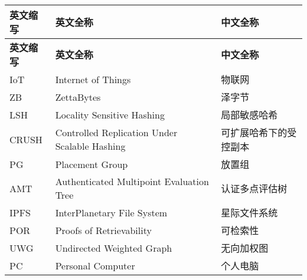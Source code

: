 \cleardoublepage
{}
\begin{center}
    \begin{longtable}{m{2cm}m{8cm}m{5cm}}
        \toprule
        \textbf{英文缩写}&\textbf{英文全称}&\textbf{中文全称}\\
        \midrule
        \endfirsthead
        \toprule
        \textbf{英文缩写}&\textbf{英文全称}&\textbf{中文全称}\\
        \midrule
        \endhead 
        \bottomrule
        \endfoot
        \bottomrule
        \endlastfoot
        IoT&Internet of Things&物联网\\
        ZB&ZettaBytes&泽字节\\
        LSH&Locality Sensitive Hashing&局部敏感哈希\\
        CRUSH&Controlled Replication Under Scalable Hashing&可扩展哈希下的受控副本\\
        PG&Placement Group&放置组\\
        AMT&Authenticated Multipoint Evaluation Tree&认证多点评估树\\
        IPFS&InterPlanetary File System&星际文件系统\\
        POR&Proofs of Retrievability&可检索性\\
        UWG&Undirected Weighted Graph&无向加权图\\
        PC&Personal Computer&个人电脑\\
	\end{longtable}
\end{center}